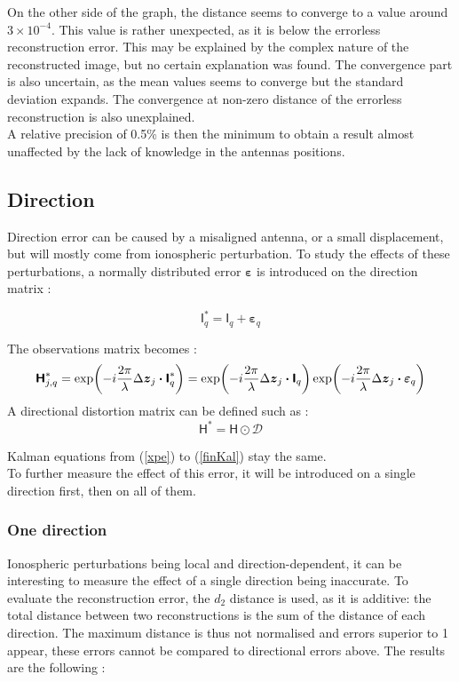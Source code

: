 \documentclass[titlepage,11pt]{article}
\renewcommand{\H}{\boldsymbol{\mathsf{H}}}
\newcommand{\I}{\boldsymbol{\mathsf{I}}}
\newcommand{\dz}{\Delta\boldsymbol{z}}
\newcommand{\vbeps}{\boldsymbol{\varepsilon}}
\newcommand{\D}{\mathcal{D}}
\begin{document}
	On the other side of the graph, the distance seems to converge to a value around $3\times10^{-4}$. This value is rather unexpected, as it is below the errorless reconstruction error. This may be explained by the complex nature of the reconstructed image, but no certain explanation was found. The convergence part is also uncertain, as the mean values seems to converge but the standard deviation expands. The convergence at non-zero distance of the errorless reconstruction is also unexplained. \\
	
	A relative precision of 0.5\% is then the minimum to obtain a result almost unaffected by the lack of knowledge in the antennas positions.
	
	\subsection{Direction}
	
	Direction error can be caused by a misaligned antenna, or a small displacement, but will mostly come from ionospheric perturbation\cite{iono}. To study the effects of these perturbations, a normally distributed error $\vbeps$ is introduced on the direction matrix :
	
	\begin{equation}
		\I_q^* = \I_q + \vbeps_q
	\end{equation}

	The observations matrix becomes :
	$$
		\H_{j,q}^* = \exp(-i\frac{2\pi}{\lambda}\dz_{j}\dotproduct\I_q^*) = \exp(-i\frac{2\pi}{\lambda}\dz_{j}\dotproduct\I_q)\exp(-i\frac{2\pi}{\lambda}\dz_{j}\dotproduct\vbeps_q)
	$$
	A directional distortion matrix can be defined such as :
	\begin{equation}
		\H^* = \H \odot \D
	\end{equation}

	Kalman equations from (\ref{xpe}) to (\ref{finKal}) stay the same.\\
	
	To further measure the effect of this error, it will be introduced on a single direction first, then on all of them. 
	
	\subsubsection{One direction}
	
	Ionospheric perturbations being local and direction-dependent, it can be interesting to measure the effect of a single direction being inaccurate. To evaluate the reconstruction error, the $d_2$ distance is used, as it is additive: the total distance between two reconstructions is the sum of the distance of each direction. The maximum distance is thus not normalised and errors superior to 1 appear, these errors cannot be compared to directional errors above. The results are the following :
	
\end{document}
